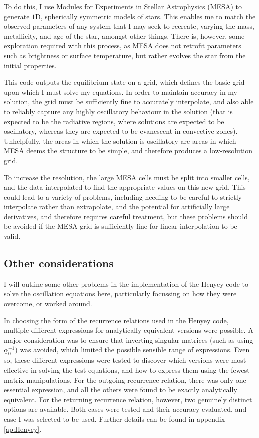 \documentclass[11pt]{amsart}
\begin{document}
To do this, I use Modules for Experiments in Stellar Astrophysics (MESA) \cite{Paxton2011} to generate $1$D, spherically symmetric models of stars.  This enables me to match the observed parameters of any system that I may seek to recreate, varying the mass, metallicity, and age of the star, amongst other things.  There is, however, some exploration required with this process, as MESA does not retrofit parameters such as brightness or surface temperature, but rather evolves the star from the initial properties.

This code outputs the equilibrium state on a grid, which defines the basic grid upon which I must solve my equations.  In order to maintain accuracy in my solution, the grid must be sufficiently fine to accurately interpolate, and also able to reliably capture any highly oscillatory behaviour in the solution (that is expected to be the radiative regions, where solutions are expected to be oscillatory, whereas they are expected to be evanescent in convective zones).  Unhelpfully, the areas in which the solution is oscillatory are areas in which MESA deems the structure to be simple, and therefore produces a low-resolution grid.

To increase the resolution, the large MESA cells must be split into smaller cells, and the data interpolated to find the appropriate values on this new grid.  This could lead to a variety of problems, including needing to be careful to strictly interpolate rather than extrapolate, and the potential for artificially large derivatives, and therefore requires careful treatment, but these problems should be avoided if the MESA grid is sufficiently fine for linear interpolation to be valid.






\subsection{Other considerations}   \label{Implement:Other}

I will outline some other problems in the implementation of the Henyey code to solve the oscillation equations here, particularly focussing on how they were overcome, or worked around.


In choosing the form of the recurrence relations used in the Henyey code, multiple different expressions for analytically equivalent versions were possible.  A major consideration was to ensure that inverting singular matrices (such as using $\underline{\alpha}_{0}^{-1}$) was avoided, which limited the possible sensible range of expressions.  Even so, these different expressions were tested to discover which versions were most effective in solving the test equations, and how to express them using the fewest matrix manipulations.  For the outgoing recurrence relation, there was only one essential expression, and all the others were found to be exactly analytically equivalent.  For the returning recurrence relation, however, two genuinely distinct options are available.  Both cases were tested and their accuracy evaluated, and case I was selected to be used.  Further details can be found in appendix \ref{ap:Henyey}.
\end{document}
